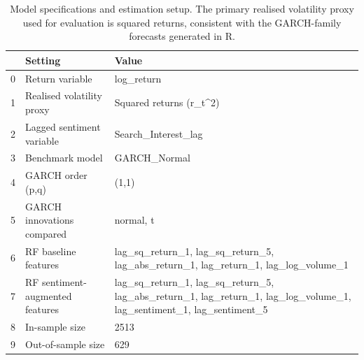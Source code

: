 \begin{table}
\caption{Model specifications and estimation setup. The primary realised volatility proxy used for evaluation is squared returns, consistent with the GARCH-family forecasts generated in R.}
\label{tab:model_spec}
\begin{tabular}{lll}
\toprule
 & Setting & Value \\
\midrule
0 & Return variable & log_return \\
1 & Realised volatility proxy & Squared returns (r_t^2) \\
2 & Lagged sentiment variable & Search_Interest_lag \\
3 & Benchmark model & GARCH_Normal \\
4 & GARCH order (p,q) & (1,1) \\
5 & GARCH innovations compared & normal, t \\
6 & RF baseline features & lag_sq_return_1, lag_sq_return_5, lag_abs_return_1, lag_return_1, lag_log_volume_1 \\
7 & RF sentiment-augmented features & lag_sq_return_1, lag_sq_return_5, lag_abs_return_1, lag_return_1, lag_log_volume_1, lag_sentiment_1, lag_sentiment_5 \\
8 & In-sample size & 2513 \\
9 & Out-of-sample size & 629 \\
\bottomrule
\end{tabular}
\end{table}
